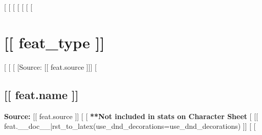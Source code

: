 [%
  [%
[%
  [%
[%
[%
  [%
\section*{[[ feat_type ]]}
[%
  [%
    [%
[Source: [[ feat.source ]]]
    [%
\subsection*{[[ feat.name ]]}
\textbf{Source:} [[ feat.source ]]
    [%
    [%
\textbf{**Not included in stats on Character Sheet}
    [%
[[ feat.__doc__|rst_to_latex(use_dnd_decorations=use_dnd_decorations) ]]
  [%
[%
